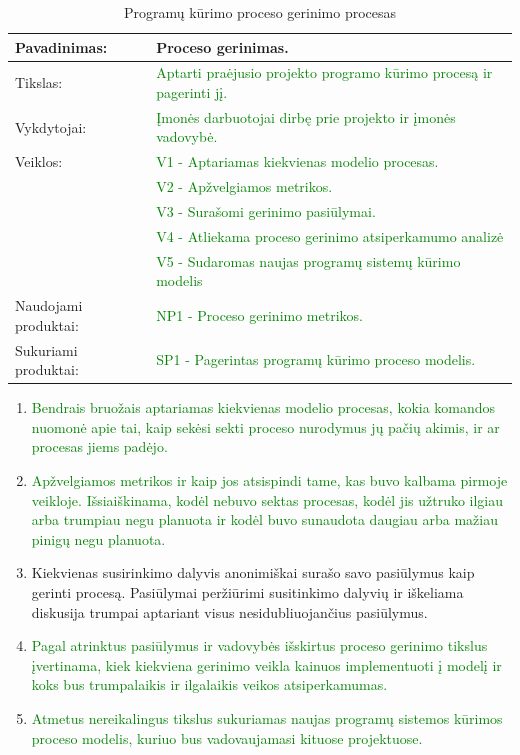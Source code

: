 \documentclass{VUMIFPSkursinis}
\begin{document}
	\begin{center}
		\begin{table}[ht]
			\caption{Programų kūrimo proceso gerinimo procesas}
			\begin{tabular}{ | l | l | }
				\hline
				Pavadinimas:         & Proceso gerinimas.						\\ \hline
				Tikslas:             & \textcolor{green}{Aptarti praėjusio projekto programo kūrimo procesą ir pagerinti jį.}			\\ \hline
				Vykdytojai:          & \textcolor{green}{ Įmonės darbuotojai dirbę prie projekto ir įmonės vadovybė.}					\\ \hline
				Veiklos:             & \textcolor{green}{V1 - Aptariamas kiekvienas modelio procesas.} 				\\
				                     & \textcolor{green}{V2 - Apžvelgiamos metrikos.}	\\
				                     & \textcolor{green}{V3 - Surašomi gerinimo pasiūlymai.}				\\ 
				                     & \textcolor{green}{V4 - Atliekama proceso gerinimo atsiperkamumo analizė} \\ 
				                     & \textcolor{green}{V5 - Sudaromas naujas programų sistemų kūrimo modelis} \\ \hline
				Naudojami produktai: & \textcolor{green}{NP1 - Proceso gerinimo metrikos. }				\\ \hline
				Sukuriami produktai: & \textcolor{green}{SP1 - Pagerintas programų kūrimo proceso modelis.}		\\ \hline
			\end{tabular}
		\end{table}
	\end{center}

	\begin{enumerate}
		\item{\textcolor{green}{Bendrais bruožais aptariamas kiekvienas modelio procesas, kokia komandos nuomonė apie tai, kaip sekėsi sekti proceso nurodymus jų pačių akimis, ir ar procesas jiems padėjo.}}
		\item{\textcolor{green}{Apžvelgiamos metrikos ir kaip jos atsispindi tame, kas buvo kalbama pirmoje veikloje. 
			Išsiaiškinama, kodėl nebuvo sektas procesas, kodėl jis užtruko ilgiau arba trumpiau negu planuota ir kodėl buvo sunaudota daugiau arba mažiau pinigų negu planuota.}}
		\item{Kiekvienas susirinkimo dalyvis anonimiškai surašo savo pasiūlymus kaip gerinti procesą.
			Pasiūlymai peržiūrimi susitinkimo dalyvių ir iškeliama diskusija trumpai aptariant visus nesidubliuojančius pasiūlymus.}
		\item{\textcolor{green}{Pagal atrinktus pasiūlymus ir vadovybės išskirtus proceso gerinimo tikslus įvertinama, kiek kiekviena gerinimo veikla kainuos implementuoti į modelį ir koks bus trumpalaikis ir ilgalaikis veikos atsiperkamumas.}}
		\item{\textcolor{green}{Atmetus nereikalingus tikslus sukuriamas naujas programų sistemos kūrimos proceso modelis, kuriuo bus vadovaujamasi kituose projektuose.}}
	\end{enumerate}
\end{document}
